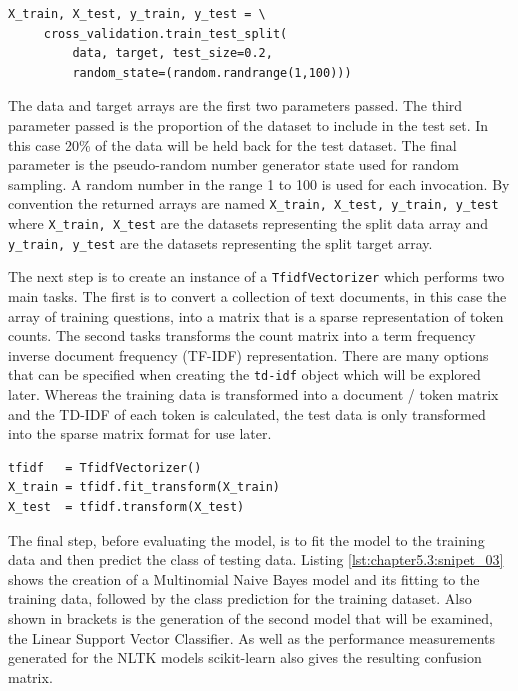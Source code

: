 \begin{lstlisting}[caption={Using the cross validation train test split function}, label=lst:chapter5.3:snipet_01]
X_train, X_test, y_train, y_test = \
     cross_validation.train_test_split(
         data, target, test_size=0.2,
         random_state=(random.randrange(1,100)))
\end{lstlisting}

The data and target arrays are the first two parameters passed. The third parameter passed is the proportion of the dataset to include in the test set. In this case 20\% of the data will be held back for the test dataset. The final parameter is the pseudo-random number generator state used for random sampling. A random number in the range 1 to 100 is used for each invocation. By convention the returned arrays are named \verb|X_train, X_test, y_train, y_test| where \verb|X_train, X_test| are the datasets representing the split data array and \verb|y_train, y_test| are the datasets representing the split target array.

The next step is to create an instance of a \verb|TfidfVectorizer| which performs two main tasks. The first is to convert a collection of text documents, in this case the array of training questions, into a matrix that is a sparse representation of token counts. The second tasks transforms the count matrix into a term frequency inverse document frequency (TF-IDF) representation. There are many options that can be specified when creating the \verb|td-idf| object which will be explored later. Whereas the training data is transformed into a document / token matrix and the TD-IDF of each token is calculated, the test data is only transformed into the sparse matrix format for use later.

\begin{lstlisting}[caption={Create TfidfVectorizer and transform training and test data}, label=lst:chapter5.3:snipet_02]
tfidf   = TfidfVectorizer()
X_train = tfidf.fit_transform(X_train)
X_test  = tfidf.transform(X_test)
\end{lstlisting}

The final step, before evaluating the model, is to fit the model to the training data and then predict the class of testing data. Listing \ref{lst:chapter5.3:snipet_03} shows the creation of a Multinomial Naive Bayes model and its fitting to the training data, followed by the class prediction for the training dataset. Also shown in brackets is the generation of the second model that will be examined, the Linear Support Vector Classifier. As well as the performance measurements generated for the NLTK models scikit-learn also gives the resulting confusion matrix.

